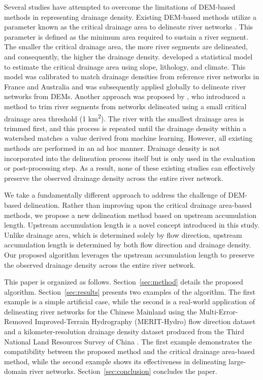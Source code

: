 \documentclass[water,article,submit,pdftex,moreauthors]{Definitions/mdpi}
\begin{document}
Several studies have attempted to overcome the limitations of DEM-based methods in representing drainage density. Existing DEM-based methods utilize a parameter known as the critical drainage area to delineate river networks \citep{tarboton1991HP}. This parameter is defined as the minimum area required to sustain a river segment. The smaller the critical drainage area, the more river segments are delineated, and consequently, the higher the drainage density. \citet{schneider2017GRL} developed a statistical model to estimate the critical drainage area using slope, lithology, and climate. This model was calibrated to match drainage densities from reference river networks in France and Australia and was subsequently applied globally to delineate river networks from DEMs. Another approach was proposed by \citet{lin2021SD}, who introduced a method to trim river segments from networks delineated using a small critical drainage area threshold (1 km\textsuperscript{2}). The river with the smallest drainage area is trimmed first, and this process is repeated until the drainage density within a watershed matches a value derived from machine learning. However, all existing methods are performed in an ad hoc manner. Drainage density is not incorporated into the delineation process itself but is only used in the evaluation or post-processing step. As a result, none of these existing studies can effectively preserve the observed drainage density across the entire river network.

We take a fundamentally different approach to address the challenge of DEM-based delineation. Rather than improving upon the critical drainage area-based methods, we propose a new delineation method based on upstream accumulation length. Upstream accumulation length is a novel concept introduced in this study. Unlike drainage area, which is determined solely by flow direction, upstream accumulation length is determined by both flow direction and drainage density. Our proposed algorithm leverages the upstream accumulation length to preserve the observed drainage density across the entire river network.

This paper is organized as follows. Section~\ref{sec:method} details the proposed algorithm. Section~\ref{sec:results} presents two examples of the algorithm. The first example is a simple artificial case, while the second is a real-world application of delineating river networks for the Chinese Mainland using the Multi-Error-Removed Improved-Terrain Hydrography (MERIT-Hydro) flow direction dataset \citep{yamazaki2019WRR} and a kilometer-resolution drainage density dataset produced from the Third National Land Resources Survey of China \citep{zhang2024CDB}. The first example demonstrates the compatibility between the proposed method and the critical drainage area-based method, while the second example shows its effectiveness in delineating large-domain river networks. Section~\ref{sec:conclusion} concludes the paper.
\end{document}

